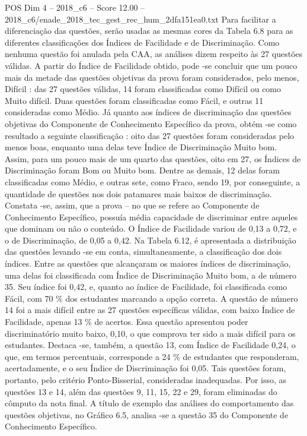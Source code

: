 \begin{textsample}{POS Dim 4 – 2018\_c6 – Score 12.00 – 2018\_c6/enade\_2018\_tec\_gest\_rec\_hum\_2dfa151ea0.txt}
Para facilitar a diferenciação das questões, serão usadas as mesmas cores da Tabela 6.8 para as diferentes classificações dos Índices de Facilidade e de Discriminação.
Como nenhuma questão foi anulada pela CAA, as análises dizem respeito às 27 questões válidas.
A partir do Índice de Facilidade obtido, pode -se concluir que um pouco mais da metade das questões objetivas da prova foram considerados, pelo menos, Difícil : das 27 questões válidas, 14 foram classificadas como Difícil ou como Muito difícil.
Duas questões foram classificadas como Fácil, e outras 11 consideradas como Médio.
Já quanto aos índices de discriminação das questões objetivas do Componente de Conhecimento Específico da prova, obtém -se como resultado a seguinte classificação : oito das 27 questões foram consideradas pelo menos boas, enquanto uma delas teve Índice de Discriminação Muito bom.
Assim, para um pouco mais de um quarto das questões, oito em 27, os Índices de Discriminação foram Bom ou Muito bom.
Dentre as demais, 12 delas foram classificadas como Médio, e outras sete, como Fraco, sendo 19, por conseguinte, a quantidade de questões nos dois patamares mais baixos de discriminação.
Constata -se, assim, que a prova – no que se refere ao Componente de Conhecimento Específico, possuía média capacidade de discriminar entre aqueles que dominam ou não o conteúdo.
O Índice de Facilidade variou de 0,13 a 0,72, e o de Discriminação, de 0,05 a 0,42.
Na Tabela 6.12, é apresentada a distribuição das questões levando -se em conta, simultaneamente, a classificação dos dois índices.
Entre as questões que alcançaram os maiores índices de discriminação, uma delas foi classificada com Índice de Discriminação Muito bom, a de número 35.
Seu índice foi 0,42, e, quanto ao índice de Facilidade, foi classificada como Fácil, com 70 \% dos estudantes marcando a opção correta.
A questão de número 14 foi a mais difícil entre as 27 questões específicas válidas, com baixo Índice de Facilidade, apenas 13 \% de acertos.
Essa questão apresentou poder discriminatório muito baixo, 0,10, o que comprova ter sido a mais difícil para os estudantes.
Destaca -se, também, a questão 13, com Índice de Facilidade 0,24, o que, em termos percentuais, corresponde a 24 \% de estudantes que responderam, acertadamente, e o seu Índice de Discriminação foi 0,05.
Tais questões foram, portanto, pelo critério Ponto-Bisserial, consideradas inadequadas.
Por isso, as questões 13 e 14, além das questões 9, 11, 15, 22 e 29, foram eliminadas do cômputo da nota final.
A título de exemplo das análises do comportamento das questões objetivas, no Gráfico 6.5, analisa -se a questão 35 do Componente de Conhecimento Específico.

\end{textsample}
